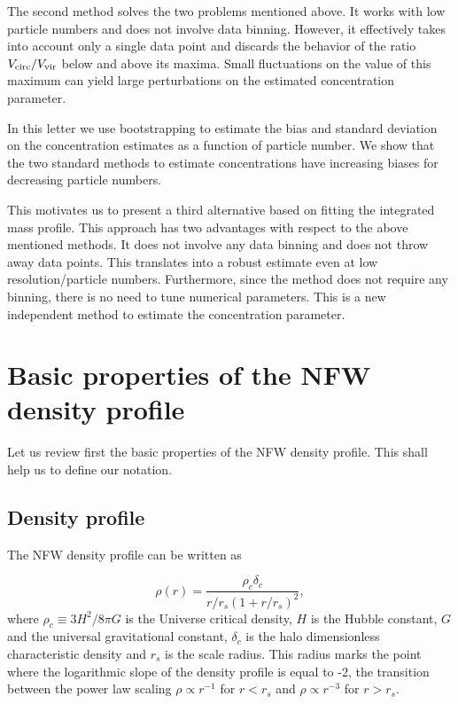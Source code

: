 \documentclass{emulateapj}
\begin{document}
The second method solves the two problems mentioned above.  
It works with low particle numbers and does not involve data binning.  
However,
it effectively takes into account only a single data point and
discards the behavior of the ratio $V_{\rm circ}/V_{\rm vir}$ below
and above its maxima.  
Small fluctuations on the value of this maximum
can yield large perturbations on the estimated concentration
parameter.

In this letter we use bootstrapping to estimate the bias and standard
deviation on the concentration estimates as a function of particle
number. 
We show that the two standard methods to estimate concentrations have
increasing biases for decreasing particle numbers.  


This motivates us to present a third alternative based on fitting the
integrated mass profile.  
This approach has two advantages with respect to the above mentioned methods.  
It does not involve any data binning and does not throw away data points.  
This translates into a robust estimate even at low resolution/particle numbers.  
Furthermore, since the method does not require any binning, there is no need to
tune numerical parameters.   
This is a new independent method to estimate the
concentration parameter.   


\section{Basic properties of the NFW density profile}
\label{sec:basics}

Let us review first the basic properties of the NFW density profile.
This shall help us to define our notation.

\subsection{Density profile}

The NFW density profile can be written as

\begin{equation}
\rho(r) = \frac{\rho_c\delta_c}{r/r_s(1+r/r_s)^2},
\label{eq:definition}
\end{equation}
%
where $\rho_c\equiv 3H^2/8\pi G$ is the Universe critical density, $H$
is the Hubble constant, $G$ and the universal gravitational constant,
$\delta_c$ is the halo dimensionless characteristic density and $r_s$
is the scale radius.  This radius marks the point where the
logarithmic slope of the density profile is equal to -2, the
transition between the power law scaling $\rho\propto r^{-1}$ for
$r<r_s$ and $\rho\propto r^{-3}$ for $r>r_s$.
\end{document}
